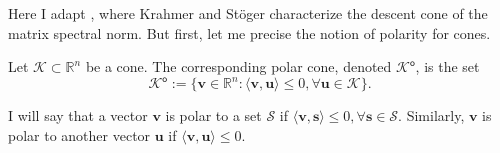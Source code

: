 Here I adapt \cite[Lemma 4.1]{krahmer2019}, where Krahmer and St\"{o}ger characterize the descent cone of the matrix spectral norm. But first, let me precise the notion of polarity for cones.

\begin{definition}\label{def:polar_cone}
    Let $\mathcal{K} \subset \mathbb{R}^{n}$ be a cone. The corresponding polar cone, denoted $\mathcal{K}^{\mathsf{o}}$, is the set
    \begin{equation}
        \mathcal{K}^{\mathsf{o}} := \{ \mathbf{v} \in \mathbb{R}^{n} : \langle \mathbf{v}, \mathbf{u} \rangle \leq 0, \forall \mathbf{u} \in \mathcal{K}\}.
    \end{equation}
\end{definition}

I will say that a vector $\mathbf{v}$ is polar to a set $\mathcal{S}$ if $\langle \mathbf{v}, \mathbf{s}\rangle \leq 0, \forall \mathbf{s} \in \mathcal{S}$. Similarly, $\mathbf{v}$ is polar to another vector $\mathbf{u}$ if $\langle \mathbf{v}, \mathbf{u}\rangle \leq 0$.

